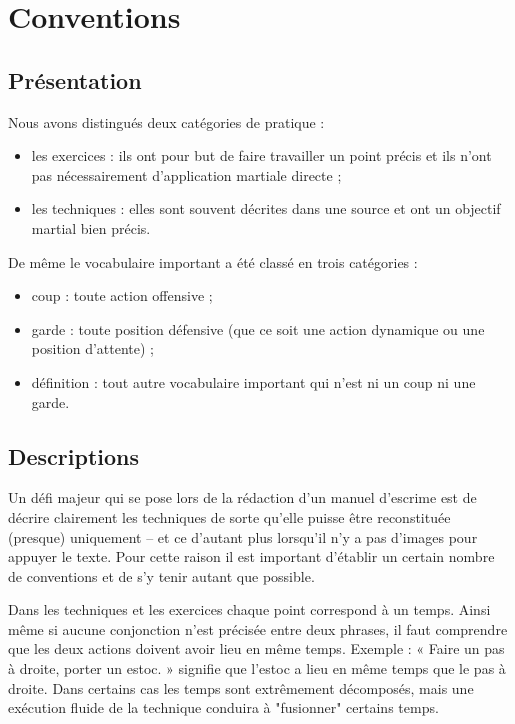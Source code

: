 \chapter{Conventions}
\label{app:conventions}


\section{Présentation}


\noindent
Nous avons distingués deux catégories de pratique :
\begin{itemize}
	\item les exercices : ils ont pour but de faire travailler un point précis et ils n'ont pas nécessairement d'application martiale directe ;
	\item les techniques : elles sont souvent décrites dans une source et ont un objectif martial bien précis.
\end{itemize}
De même le vocabulaire important a été classé en trois catégories :
\begin{itemize}
	\item coup : toute action offensive ;
	\item garde : toute position défensive (que ce soit une action dynamique ou une position d'attente) ;
	\item définition : tout autre vocabulaire important qui n'est ni un coup ni une garde.
\end{itemize}


\section{Descriptions}


Un défi majeur qui se pose lors de la rédaction d'un manuel d'escrime est de décrire clairement les techniques de sorte qu'elle puisse être reconstituée (presque) uniquement – et ce d'autant plus lorsqu'il n'y a pas d'images pour appuyer le texte.
Pour cette raison il est important d'établir un certain nombre de conventions et de s'y tenir autant que possible.

Dans les techniques et les exercices chaque point correspond à un temps.
Ainsi même si aucune conjonction n'est précisée entre deux phrases, il faut comprendre que les deux actions doivent avoir lieu en même temps.
Exemple : « Faire un pas à droite, porter un estoc. » signifie que l'estoc a lieu en même temps que le pas à droite.
Dans certains cas les temps sont extrêmement décomposés, mais une exécution fluide de la technique conduira à "fusionner" certains temps.

